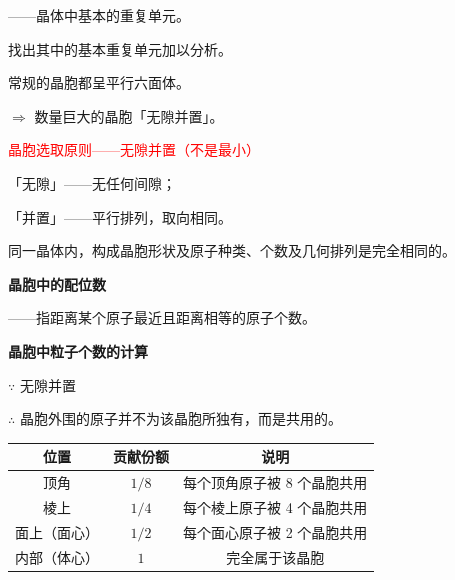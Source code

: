         ——晶体中基本的重复单元。

        找出其中的基本重复单元加以分析。

        常规的晶胞都呈平行六面体。

        \(\Rightarrow\) 数量巨大的晶胞「无隙并置」。

        \textcolor{red}{晶胞选取原则——无隙并置（不是最小）}

        「无隙」——无任何间隙；

        「并置」——平行排列，取向相同。

        同一晶体内，构成晶胞形状及原子种类、个数及几何排列是完全相同的。

        \textbf{晶胞中的配位数}

        ——指距离某个原子最近且距离相等的原子个数。

        \textbf{晶胞中粒子个数的计算}

        \(\because\) 无隙并置

        \(\therefore\) 晶胞外围的原子并不为该晶胞所独有，而是共用的。

        \begin{center}
        \begin{tabular}{|c|c|c|}
            \hline
            \textbf{位置} & \textbf{贡献份额} & \textbf{说明} \\
            \hline
            顶角 & \(1/8\) & 每个顶角原子被 8 个晶胞共用 \\
            \hline
            棱上 & \(1/4\) & 每个棱上原子被 4 个晶胞共用 \\
            \hline
            面上（面心） & \(1/2\) & 每个面心原子被 2 个晶胞共用 \\
            \hline
            内部（体心） & \(1\) & 完全属于该晶胞 \\
            \hline
        \end{tabular}
        \end{center}

